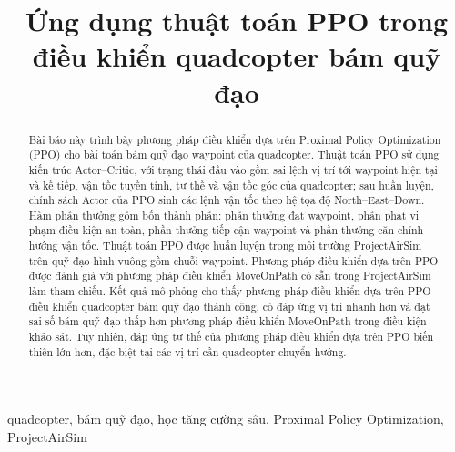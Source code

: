 \documentclass[conference]{IEEEtran}
\begin{document}
\renewcommand{\figurename}{Hình}
\renewcommand{\tablename}{Bảng}
\renewcommand{\IEEEkeywordsname}{Keywords}
\renewcommand{\refname}{Tài liệu tham khảo}

\title{Ứng dụng thuật toán PPO trong điều khiển quadcopter bám quỹ đạo }

\author{
\and
{}

}

\maketitle

\begin{abstract}
Bài báo này trình bày phương pháp điều khiển dựa trên Proximal Policy Optimization (PPO) cho bài toán bám quỹ đạo waypoint của quadcopter. Thuật toán PPO sử dụng kiến trúc Actor--Critic, với trạng thái đầu vào gồm sai lệch vị trí tới waypoint hiện tại và kế tiếp, vận tốc tuyến tính, tư thế và vận tốc góc của quadcopter; sau huấn luyện, chính sách Actor của PPO sinh các lệnh vận tốc theo hệ tọa độ North--East--Down. Hàm phần thưởng gồm bốn thành phần: phần thưởng đạt waypoint, phần phạt vi phạm điều kiện an toàn, phần thưởng tiếp cận waypoint và phần thưởng căn chỉnh hướng vận tốc. Thuật toán PPO được huấn luyện trong môi trường ProjectAirSim trên quỹ đạo hình vuông gồm chuỗi waypoint. Phương pháp điều khiển dựa trên PPO được đánh giá với phương pháp điều khiển MoveOnPath có sẵn trong ProjectAirSim làm tham chiếu. Kết quả mô phỏng cho thấy phương pháp điều khiển dựa trên PPO điều khiển quadcopter bám quỹ đạo thành công, có đáp ứng vị trí nhanh hơn và đạt sai số bám quỹ đạo thấp hơn phương pháp điều khiển MoveOnPath trong điều kiện khảo sát. Tuy nhiên, đáp ứng tư thế của phương pháp điều khiển dựa trên PPO biến thiên lớn hơn, đặc biệt tại các vị trí cần quadcopter chuyển hướng.
\end{abstract}

\begin{IEEEkeywords}
quadcopter, bám quỹ đạo, học tăng cường sâu, Proximal Policy Optimization, ProjectAirSim
\end{IEEEkeywords}








\end{document}
